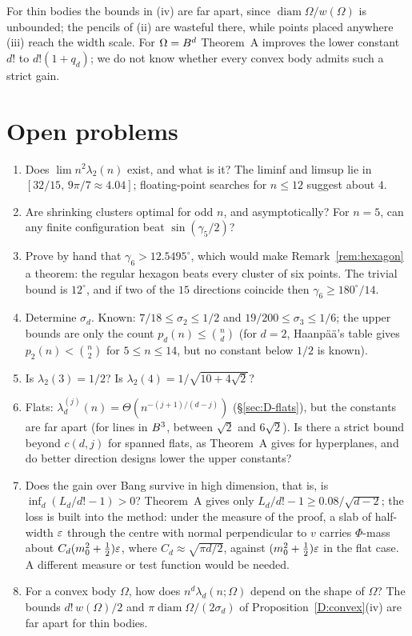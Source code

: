 \documentclass[11pt]{article}
\begin{document}
For thin bodies the bounds in (iv) are far apart, since $\operatorname{diam}\Omega/w(\Omega)$ is unbounded; the pencils of (ii)
are wasteful there, while points placed anywhere (iii) reach the width scale. For $\Omega=B^d$ Theorem~A improves the
lower constant $d!$ to $d!(1+q_d)$; we do not know whether every convex body admits such a strict gain.

\section{Open problems}\label{sec:open}

\begin{enumerate}
\item Does $\lim n^2\lambda_2(n)$ exist, and what is it? The liminf and limsup lie in
$[32/15,\,9\pi/7\approx4.04]$; floating-point searches for $n\le12$ suggest about $4$.
\item Are shrinking clusters optimal for odd $n$, and asymptotically? For $n=5$, can any finite
configuration beat $\sin(\gamma_5/2)$?
\item Prove by hand that $\gamma_6>12.5495^\circ$, which would make Remark~\ref{rem:hexagon} a theorem: the regular hexagon
beats every cluster of six points. The trivial bound is $12^\circ$, and if two of the $15$ directions coincide then
$\gamma_6\ge180^\circ/14$.
\item Determine $\sigma_d$. Known: $7/18\le\sigma_2\le1/2$ and $19/200\le\sigma_3\le1/6$; the upper
bounds are only the count $p_d(n)\le\binom nd$ (for $d=2$, Haanp\"a\"a's table gives $p_2(n)<\binom n2$ for $5\le n\le14$,
but no constant below $1/2$ is known).
\item Is $\lambda_2(3)=1/2$? Is $\lambda_2(4)=1/\sqrt{10+4\sqrt2}$?
\item Flats: $\lambda_d^{(j)}(n)=\Theta(n^{-(j+1)/(d-j)})$ (\S\ref{sec:D-flats}), but the constants are
far apart (for lines in $B^3$, between $\sqrt2$ and $6\sqrt2$). Is there a strict bound beyond
$c(d,j)$ for spanned flats, as Theorem~A gives for hyperplanes, and do better direction designs lower
the upper constants?
\item Does the gain over Bang survive in high dimension, that is, is $\inf_d(L_d/d!-1)>0$? Theorem~A
gives only $L_d/d!-1\ge0.08/\sqrt{d-2}$; the loss is built into the method: under the measure of the
proof, a slab of half-width $\varepsilon$ through the centre with normal perpendicular to $v$ carries
$\Phi$-mass about $C_d(m_0^2+\frac12)\varepsilon$, where $C_d\approx\sqrt{\pi d/2}$, against
$(m_0^2+\frac12)\varepsilon$ in the flat case. A different measure or test function would be needed.
\item For a convex body $\Omega$, how does $n^d\lambda_d(n;\Omega)$ depend on the shape of $\Omega$? The bounds
$d!\,w(\Omega)/2$ and $\pi\operatorname{diam}\Omega/(2\sigma_d)$ of Proposition~\ref{D:convex}(iv) are far apart
for thin bodies.
\end{enumerate}
\end{document}
